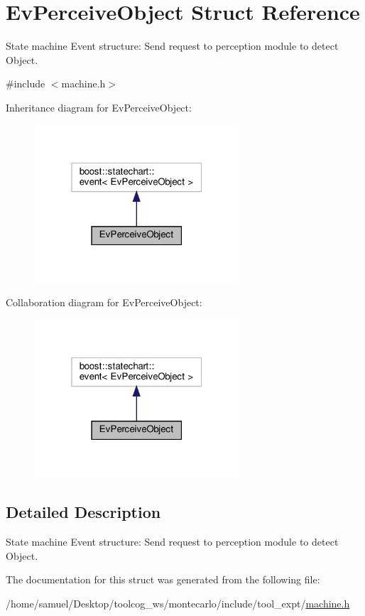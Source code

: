 \hypertarget{structEvPerceiveObject}{}\section{Ev\+Perceive\+Object Struct Reference}
\label{structEvPerceiveObject}


State machine Event structure\+: Send request to perception module to detect Object.  




{\ttfamily \#include $<$machine.\+h$>$}



Inheritance diagram for Ev\+Perceive\+Object\+:
\nopagebreak
\begin{figure}[H]
\begin{center}
\leavevmode
\includegraphics[width=217pt]{structEvPerceiveObject__inherit__graph}
\end{center}
\end{figure}


Collaboration diagram for Ev\+Perceive\+Object\+:
\nopagebreak
\begin{figure}[H]
\begin{center}
\leavevmode
\includegraphics[width=217pt]{structEvPerceiveObject__coll__graph}
\end{center}
\end{figure}


\subsection{Detailed Description}
State machine Event structure\+: Send request to perception module to detect Object. 

The documentation for this struct was generated from the following file\+:\begin{DoxyCompactItemize}
\item 
/home/samuel/\+Desktop/toolcog\+\_\+ws/montecarlo/include/tool\+\_\+expt/\hyperlink{machine_8h}{machine.\+h}\end{DoxyCompactItemize}
